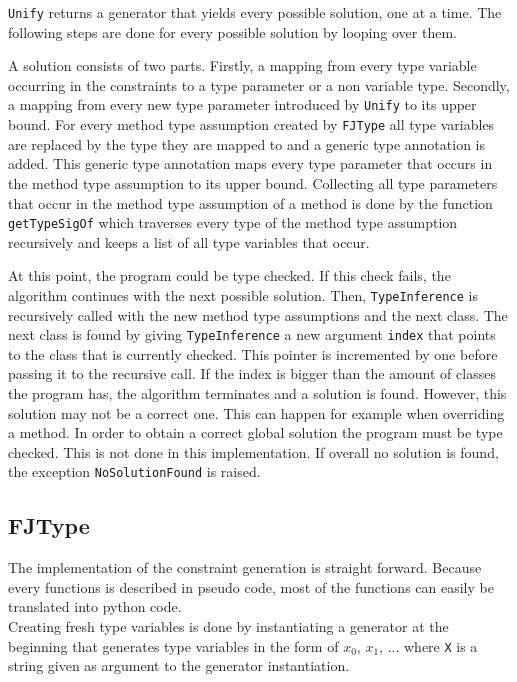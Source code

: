 \verb|Unify| returns a generator that yields every possible solution, one at a time. The following steps are done for every possible solution by looping over them.

A solution consists of two parts. Firstly, a mapping from every type variable occurring in the constraints to a type parameter or a non variable type. Secondly, a mapping from every new type parameter introduced by \verb|Unify| to its upper bound.
For every method type assumption created by \verb|FJType| all type variables are replaced by the type they are mapped to and
a generic type annotation is added. This generic type annotation maps every type parameter that occurs in the method type assumption to its upper bound.
Collecting all type parameters that occur in the method type assumption of a method is done by the function \verb|getTypeSigOf| which traverses every type of the method type assumption recursively and keeps a list of all type variables that occur.

At this point, the program could be type checked. If this check fails, the algorithm continues with the next possible solution.
Then, \verb|TypeInference| is recursively called with the new method type assumptions and the next class.
The next class is found by giving \verb|TypeInference| a new argument \verb|index| that points to the class that is currently checked. This pointer is incremented by one before passing it to the recursive call.
If the index is bigger than the amount of classes the program has, the algorithm terminates and a solution is found.
However, this solution may not be a correct one. This can happen for example when overriding a method. In order to obtain a correct global solution
the program must be type checked. This is not done in this implementation.
If overall no solution is found, the exception \verb|NoSolutionFound| is raised.

\subsection{FJType}
The implementation of the constraint generation is straight forward. Because every functions is described in pseudo code, most of the functions can easily be translated into python code. \\
Creating fresh type variables is done by instantiating a generator at the beginning that generates type variables in the form of $x_0$, $x_1$, ... where \verb|X| is a string given as argument to the generator instantiation. \\

